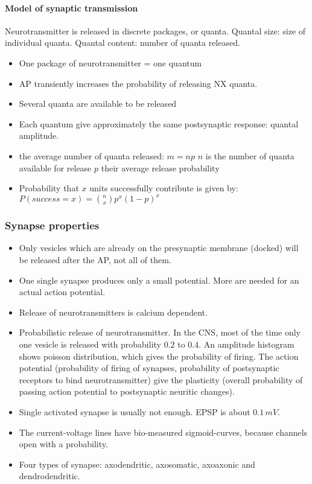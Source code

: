 \documentclass[main]{subfiles}
\begin{document}
\paragraph{Model of synaptic transmission}
Neurotransmitter is released in discrete packages, or quanta.
Quantal size: size of individual quanta.
Quantal content: number of quanta released.

\begin{itemize}
\item One package of neurotransmitter = one quantum
\item AP transiently increases the probability of releasing NX quanta.
\item Several quanta are available to be released
\item Each quantum give approximately the same postsynaptic response: quantal amplitude.
\item the average number of quanta released: $m = np$
\subitem $n$ is the number of quanta available for release
\subitem $p$ their average release probability 
\item Probability that $x$ units successfully contribute is given by: $P(success = x) = \binom{n}{x} p^x (1-p)^x$
\end{itemize}

\subsubsection{Synapse properties}
\begin{itemize}[noitemsep,nolistsep]
	\item Only vesicles which are already on the presynaptic membrane (docked) will be released after the AP, not all of them.
	\item One single synapse produces only a small potential. More are needed for an actual action potential.
	\item Release of neurotransmitters is calcium dependent.
	\item Probabilistic release of neurotransmitter.
	\subitem In the CNS, most of the time only one vesicle is released with probability $0.2$ to $0.4$.
	\subitem An amplitude histogram shows poisson distribution, which gives the probability of firing.
	\subitem The action potential (probability of firing of synapses, probability of postsynaptic receptors to bind neurotransmitter) give the plasticity (overall probability of passing action potential to postsynaptic neuritic changes).
	\item Single activated synapse is usually not enough. EPSP is about $0.1\,mV$.
	\item The current-voltage lines have bio-measured sigmoid-curves, because channels open with a probability.
	\item Four types of synapse: axodendritic, axosomatic, axoaxonic and dendrodendritic.
\end{itemize}
\end{document}
